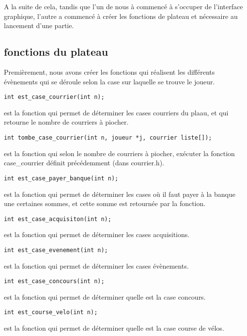 \documentclass[a4paper, 11pt]{report}
\begin{document}
A la suite de cela, tandis que l'un de nous à commencé à s'occuper de l'interface graphique, l'autre a commencé à créer les fonctions de plateau et nécessaire au lancement d'une partie.

\subsection{fonctions du plateau}
Premièrement, nous avons créer les fonctions qui réalisent les différents évènements qui se déroule selon la case sur laquelle se trouve le joueur.

\begin{verbatim}
int est_case_courrier(int n);
\end{verbatim}
est la fonction qui permet de déterminer les cases courriers du plaau, et qui retourne le nombre de courriers à piocher.

\begin{verbatim}
int tombe_case_courrier(int n, joueur *j, courrier liste[]);
\end{verbatim}
est la fonction qui selon le nombre de courriers à piocher, exécuter la fonction case\_courrier définit précédemment (dans courrier.h).

\begin{verbatim}
int est_case_payer_banque(int n);
\end{verbatim}
est la fonction qui permet de déterminer les cases où il faut payer à la banque une certaines sommes, et cette somme est retournée par la fonction.

\begin{verbatim}
int est_case_acquisiton(int n);
\end{verbatim}
est la fonction qui permet de déterminer les cases acquisitions.

\begin{verbatim}
int est_case_evenement(int n);
\end{verbatim}
est la fonction qui permet de déterminer les cases évènements.

\begin{verbatim}
int est_case_concours(int n);
\end{verbatim}
est la fonction qui permet de déterminer quelle est la case concours.

\begin{verbatim}
int est_course_velo(int n);
\end{verbatim}
est la fonction qui permet de déterminer quelle est la case course de vélos.
\end{document}

